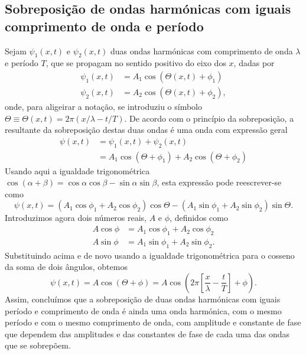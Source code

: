 \subsection{Sobreposição de ondas harmónicas com iguais comprimento de onda e
período}
\label{sec:sobrpos}
Sejam $\psi_1(x,t)$ e $\psi_2(x,t)$ duas ondas harmónicas com comprimento de
onda $\lambda$ e período $T$, que se propagam no sentido positivo do eixo dos
$x$, dadas por
\begin{align*}
\psi_1(x,t)&=A_1\cos\left(\Theta(x,t)+\phi_1\right)\\
\psi_2(x,t)&=A_2\cos\left(\Theta(x,t)+\phi_2\right),
\end{align*}
onde, para aligeirar a notação, se introduziu o símbolo
$\Theta\equiv\Theta(x,t)=2\pi(x/\lambda-t/T)$. De acordo com o princípio da
sobreposição, a resultante da sobreposição destas duas ondas é uma onda com
expressão geral
\begin{align*}
\psi(x,t)&=\psi_1(x,t)+\psi_2(x,t)\\
&=A_1\cos(\Theta+\phi_1)+A_2\cos(\Theta+\phi_2)
\end{align*}
Usando aqui a igualdade trigonométrica
$\cos(\alpha+\beta)=\cos\alpha\cos\beta-\sin\alpha\sin\beta$, esta expressão
pode reescrever-se como
\begin{equation*}
\psi(x,t)=(A_1\cos\phi_1+A_2\cos\phi_2)\cos\Theta-
(A_1\sin\phi_1+A_2\sin\phi_2)\sin\Theta.
\end{equation*}
Introduzimos agora dois números reais, $A$ e $\phi$, definidos como
\begin{align*}
A\cos\phi&=A_1\cos\phi_1+A_2\cos\phi_2\\
A\sin\phi&=A_1\sin\phi_1+A_2\sin\phi_2.
\end{align*}
Substituindo acima e de novo usando a igualdade trigonométrica para o cosseno da
soma de dois ângulos, obtemos
\begin{equation*}
\psi(x,t)=A\cos\left(\Theta+\phi\right)=
A\cos\left(2\pi\left[\frac{x}{\lambda}-\frac{t}{T}\right]+\phi\right).
\end{equation*}
Assim, concluímos que a sobreposição de duas ondas harmónicas com iguais período
e comprimento de onda é ainda uma onda harmónica, com o mesmo período e com o
mesmo comprimento de onda, com amplitude e constante de fase que dependem das amplitudes
e das constantes de fase de cada uma das ondas que se sobrepõem.

